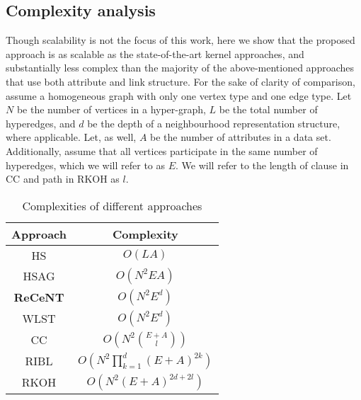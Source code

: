 \subsection{Complexity analysis}

Though scalability is not the focus of this work, here we show that the proposed approach is as scalable as the state-of-the-art kernel approaches, and substantially less complex than the majority of the above-mentioned approaches that use both attribute and link structure.
For the sake of clarity of comparison, assume a homogeneous graph with only one vertex type and one edge type.
Let $N$ be the number of vertices in a hyper-graph, $L$ be the total number of hyperedges, and $d$ be the depth of a neighbourhood representation structure, where applicable.
Let, as well, $A$ be the number of attributes in a data set.
Additionally, assume that all vertices participate in the same number of hyperedges, which we will refer to as $E$. 
We will refer to the length of clause in CC and path in RKOH as $l$.
\vspace{2pt}


\begin{table}
    \centering
    \caption{Complexities of different approaches}
    \label{tab:complexities}
    \begin{tabular}{|c|c|}
        \hline
        \textbf{Approach} & \textbf{Complexity} \\
        \hline
        \hline
        HS    & $O\left (  LA \right )$       \\
        \hline
         HSAG  & $O \left ( N^2EA \right)$     \\
        \hline
        \textbf{ReCeNT}  & $O \left ( N^2  E^d  \right )$ \\       
        \hline
         WLST  & $O \left( N^2 E^d \right ) $  \\
        \hline
        CC    & $O \left( N^2   {{E + A}\choose{l}} \right)$  \\
        \hline
        RIBL  & $O \left(  N^2 \prod_{k=1}^{d}(E + A)^{2k} \right) $  \\
        \hline
         RKOH  & $O \left(  N^2 \left( E + A \right)^{2d + 2l} \right)$ \\
        \hline
    \end{tabular}
    
\end{table}



